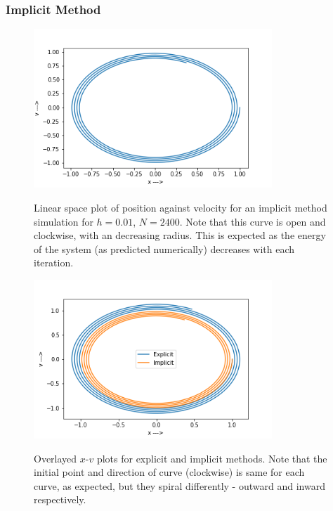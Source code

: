 \documentclass{report}
\begin{document}
\subsubsection*{Implicit Method}
\begin{figure}[H]
	\centering
	\includegraphics[width = 0.8\textwidth]{phasei1.png}
	\label{pI}
	\caption{Linear space plot of position against velocity for an implicit method simulation for $h=0.01$, $N=2400$. Note that this curve is open and clockwise, with an decreasing radius. This is expected as the energy of the system (as predicted numerically) decreases with each iteration.}
\end{figure}
\begin{figure}[H]
	\centering
	\includegraphics[width = 0.8\textwidth]{compared.png}
	\label{comEI}
	\caption{Overlayed $x$-$v$ plots for explicit and implicit methods. Note that the initial point and direction of curve (clockwise) is same for each curve, as expected, but they spiral differently - outward and inward respectively.}
\end{figure}
\end{document}
